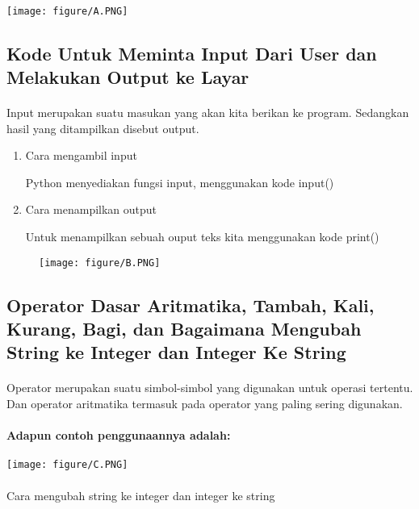 \documentclass{article}
\begin{document}
\paragraph{}
    \centerline{\texttt{[image: figure/A.PNG]}}

\subsection{Kode Untuk Meminta Input Dari User dan Melakukan Output ke Layar}
\paragraph{} Input merupakan suatu masukan yang akan kita berikan ke program. Sedangkan hasil yang ditampilkan disebut output.
\begin{enumerate}
    \item Cara mengambil input
        \par Python menyediakan fungsi input, menggunakan kode input()
    \item Cara menampilkan output
        \par Untuk menampilkan sebuah ouput teks kita menggunakan kode print()
\end{enumerate}
\begin{figure}[h]
\centerline{\texttt{[image: figure/B.PNG]}}
\end{figure}

\subsection{Operator Dasar Aritmatika, Tambah, Kali, Kurang, Bagi, dan Bagaimana Mengubah String ke Integer dan Integer Ke String}
\paragraph{} Operator merupakan suatu simbol-simbol yang digunakan untuk operasi tertentu. Dan operator aritmatika termasuk pada operator yang paling sering digunakan. 
\paragraph{Adapun contoh penggunaannya adalah: }
\newpage\centerline{\texttt{[image: figure/C.PNG]}}
\paragraph{} 
\paragraph{} Cara mengubah string ke integer dan integer ke string
\end{document}
